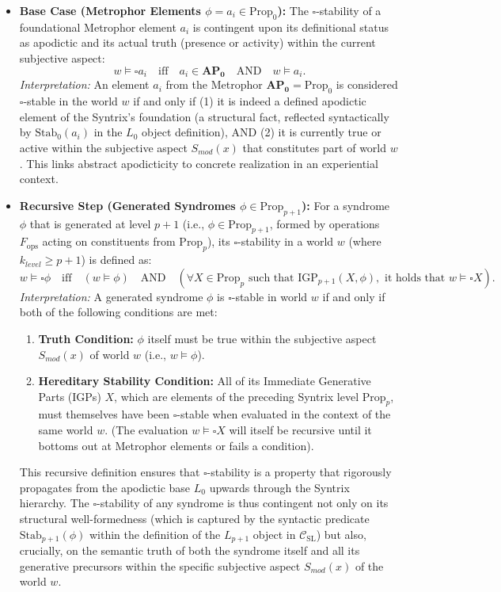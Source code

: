\documentclass[
    12pt,              %
    a4paper,           %
    headings=normal,   %
    twoside=true,      %
    BCOR=8mm,          %
]{scrbook}
\newcommand{\BoxSyn}{\square}
\newcommand{\APZero}{\mathbf{AP_0}}
\newcommand{\Propk}[1]{\text{Prop}_{#1}}
\newcommand{\IGPk}[1]{\text{IGP}_{#1}}
\newcommand{\fops}{F_{\text{ops}}}
\begin{document}
\begin{itemize}
    \item   \textbf{Base Case (Metrophor Elements \(\phi = a_i \in \Propk{0}\)):}
        The \(\BoxSyn\)-stability of a foundational Metrophor element \(a_i\) is contingent upon its definitional status as apodictic and its actual truth (presence or activity) within the current subjective aspect:
        \[ w \vDash \BoxSyn a_i \quad \text{iff} \quad a_i \in \APZero \quad \text{AND} \quad w \vDash a_i. \]
        \textit{Interpretation:} An element \(a_i\) from the Metrophor \(\APZero = \Propk{0}\) is considered \(\BoxSyn\)-stable in the world \(w\) if and only if (1) it is indeed a defined apodictic element of the Syntrix's foundation (a structural fact, reflected syntactically by \(\text{Stab}_0(a_i)\) in the \(L_0\) object definition), AND (2) it is currently true or active within the subjective aspect \(S_{mod}(x)\) that constitutes part of world \(w\). This links abstract apodicticity to concrete realization in an experiential context.

    \item   \textbf{Recursive Step (Generated Syndromes \(\phi \in \Propk{p+1}\)):}
        For a syndrome \(\phi\) that is generated at level \(p+1\) (i.e., \(\phi \in \Propk{p+1}\), formed by operations \(\fops\) acting on constituents from \(\Propk{p}\)), its \(\BoxSyn\)-stability in a world \(w\) (where \(k_{level} \ge p+1\)) is defined as:
        \[ w \vDash \BoxSyn \phi \quad \text{iff} \quad (w \vDash \phi) \quad \text{AND} \quad (\forall X \in \Propk{p} \text{ such that } \IGPk{p+1}(X, \phi), \text{ it holds that } w \vDash \BoxSyn X). \]
        \textit{Interpretation:} A generated syndrome \(\phi\) is \(\BoxSyn\)-stable in world \(w\) if and only if both of the following conditions are met:
        \begin{enumerate}[label=(\roman*)]
            \item  \textbf{Truth Condition:} \(\phi\) itself must be true within the subjective aspect \(S_{mod}(x)\) of world \(w\) (i.e., \(w \vDash \phi\)).
            \item  \textbf{Hereditary Stability Condition:} All of its Immediate Generative Parts (IGPs) \(X\), which are elements of the preceding Syntrix level \(\Propk{p}\), must themselves have been \(\BoxSyn\)-stable when evaluated in the context of the same world \(w\). (The evaluation \(w \vDash \BoxSyn X\) will itself be recursive until it bottoms out at Metrophor elements or fails a condition).
        \end{enumerate}
        This recursive definition ensures that \(\BoxSyn\)-stability is a property that rigorously propagates from the apodictic base \(L_0\) upwards through the Syntrix hierarchy. The \(\BoxSyn\)-stability of any syndrome is thus contingent not only on its structural well-formedness (which is captured by the syntactic predicate \(\text{Stab}_{p+1}(\phi)\) within the definition of the \(L_{p+1}\) object in \(\mathcal{C}_{\text{SL}}\)) but also, crucially, on the semantic truth of both the syndrome itself and all its generative precursors within the specific subjective aspect \(S_{mod}(x)\) of the world \(w\).
\end{itemize}
\end{document}
